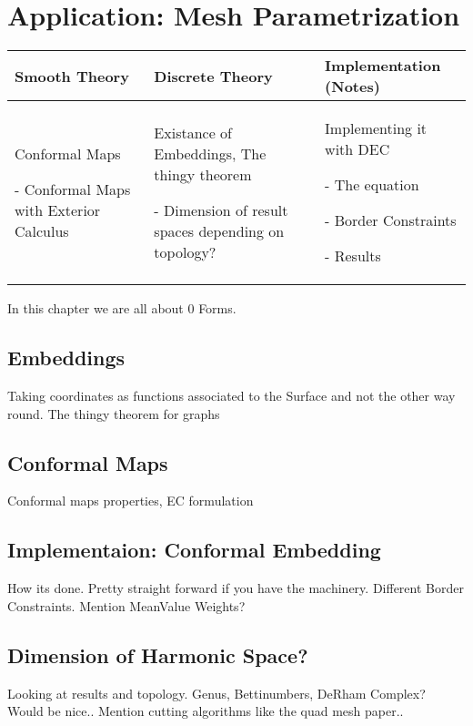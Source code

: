 \documentclass[draft]{scrbook}
\newenvironment{packed_enum}{
\begin{enumerate}
  \setlength{\itemsep}{1pt}
  \setlength{\parskip}{0pt}
  \setlength{\parsep}{0pt}
}{\end{enumerate}}
\begin{document}
\section{Application: Mesh Parametrization}
	\begin{longtable}{|p{4.5cm}|p{4.5cm}|p{4.5cm}|}
		\hline
		Smooth Theory& Discrete Theory& Implementation (Notes)\\
		\hline
			Conformal Maps
			\begin{packed_enum}
				\item[-] Conformal Maps with Exterior Calculus
			\end{packed_enum}
			&
			Existance of Embeddings, The thingy theorem
			\begin{packed_enum}
				\item[-] Dimension of result spaces depending on topology?
			\end{packed_enum}
			 & 
			 Implementing it with DEC
			 \begin{packed_enum}
				\item[-] The equation
				\item[-] Border Constraints
				\item[-] Results
			\end{packed_enum}
			 \\		
		\hline
	\end{longtable}
	In this chapter we are all about 0 Forms.
	\subsection{Embeddings}
	Taking coordinates as functions associated to the Surface and not the other way round. The thingy theorem for graphs
	\subsection{Conformal Maps}
	Conformal maps properties, EC formulation
	\subsection{Implementaion: Conformal Embedding}
		How its done. Pretty straight forward if you have the machinery. Different Border Constraints. Mention MeanValue Weights?
	\subsection{Dimension of Harmonic Space?}
		Looking at results and topology. Genus, Bettinumbers, DeRham Complex?	Would be nice..
		Mention cutting algorithms like the quad mesh paper..
\newpage	
\end{document}
